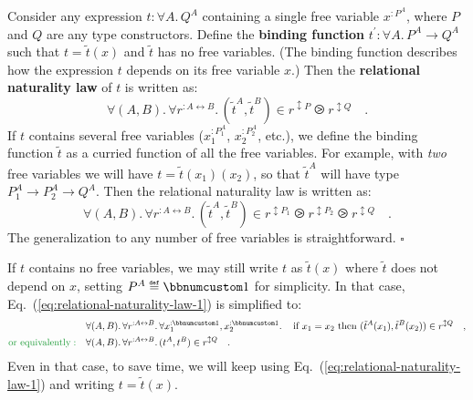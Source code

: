 Consider any expression $t:\forall A.\,Q^{A}$ containing a single
free variable $x^{:P^{A}}$, where $P$ and
$Q$ are any type constructors. Define the \textbf{binding function}
$t^{\prime}:\forall A.\,P^{A}\rightarrow Q^{A}$ such that $t=\tilde{t}(x)$
and $\tilde{t}$ has no free variables. (The binding function describes
how the expression $t$ depends on its free variable $x$.) Then the
\textbf{relational naturality law}
of $t$ is written as:
\begin{equation}
\forall(A,B).\,\forall r^{:A\leftrightarrow B}.\,(\tilde{t}^{A},\tilde{t}^{B})\in r^{\updownarrow P}\ogreaterthan r^{\updownarrow Q}\quad.\label{eq:relational-naturality-law-1}
\end{equation}
If $t$ contains several free variables ($x_{1}^{:P_{1}^{A}}$, $x_{2}^{:P_{2}^{A}}$,
etc.), we define the binding function $\tilde{t}$ as a curried function
of all the free variables. For example, with \emph{two} free variables
we will have $t=\tilde{t}(x_{1})(x_{2})$, so that $\tilde{t}^{A}$
will have type $P_{1}^{A}\rightarrow P_{2}^{A}\rightarrow Q^{A}$.
Then the relational naturality law is written as:
\begin{equation}
\forall(A,B).\,\forall r^{:A\leftrightarrow B}.\,(\tilde{t}^{A},\tilde{t}^{B})\in r^{\updownarrow P_{1}}\ogreaterthan r^{\updownarrow P_{2}}\ogreaterthan r^{\updownarrow Q}\quad.\label{eq:relational-naturality-law-two-free-vars}
\end{equation}
The generalization to any number of free variables is straightforward.
$\square$

If $t$ contains no free variables, we may still write $t$ as $\tilde{t}(x)$
where $\tilde{t}$ does not depend on $x$, setting $P^{A}\triangleq\bbnum 1$
for simplicity. In that case, Eq.~(\ref{eq:relational-naturality-law-1})
is simplified to:
\begin{align}
 & \forall(A,B).\,\forall r^{:A\leftrightarrow B}.\,\forall x_{1}^{:\bbnum 1},x_{2}^{:\bbnum 1}.\,\quad\text{if }x_{1}=x_{2}\text{ then }(\tilde{t}^{A}(x_{1}),\tilde{t}^{B}(x_{2}))\in r^{\updownarrow Q}\quad,\nonumber \\
{\color{greenunder}\text{or equivalently}:}\quad & \forall(A,B).\,\forall r^{:A\leftrightarrow B}.\,(t^{A},t^{B})\in r^{\updownarrow Q}\quad.\label{eq:relational-naturality-law-simplified}
\end{align}
Even in that case, to save time, we will keep using Eq.~(\ref{eq:relational-naturality-law-1})
and writing $t=\tilde{t}(x)$.

